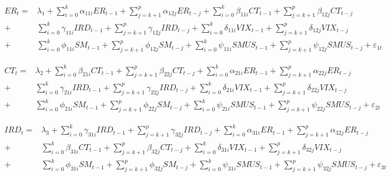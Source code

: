\documentclass[a4paper, twoside]{templates/ociamthesis}
\begin{document}
\begingroup\small

\begin{equation}
  \begin{aligned}
ER_t 
= & \lambda_1 + \sum_{i=0}^k\alpha_{11i}ER_{t-1} + \sum_{j=k+1}^p\alpha_{12j}ER_{t-j} + \sum_{i=0}^k\beta_{11i}CT_{t-1} + \sum_{j=k+1}^p\beta_{12j}CT_{t-j} \\
+ & \sum_{i=0}^k\gamma_{11i}IRD_{t-1} + \sum_{j=k+1}^p\gamma_{12j}IRD_{t-j} + \sum_{i=0}^k\delta_{11i}VIX_{t-1} + \sum_{j=k+1}^p\delta_{12j}VIX_{t-j} \\
+ & \sum_{i=0}^k\phi_{11i}SM_{t-1} + \sum_{j=k+1}^p\phi_{12j}SM_{t-j} + \sum_{i=0}^k\psi_{11i}SMUS_{t-1} + \sum_{j=k+1}^p\psi_{12j}SMUS_{t-j} +\varepsilon_{1t}
  \end{aligned}
\label{eq:b1}
\end{equation}
\endgroup

\begingroup\small

\begin{equation}
  \begin{aligned}
CT_t 
= & \lambda_2 + \sum_{i=0}^k\beta_{21i}CT_{t-1} + \sum_{j=k+1}^p\beta_{22j}CT_{t-j} + \sum_{i=0}^k\alpha_{21i}ER_{t-1} + \sum_{j=k+1}^p\alpha_{22j}ER_{t-j} \\
+ & \sum_{i=0}^k\gamma_{21i}IRD_{t-1} + \sum_{j=k+1}^p\gamma_{22j}IRD_{t-j} + \sum_{i=0}^k\delta_{21i}VIX_{t-1} + \sum_{j=k+1}^p\delta_{22j}VIX_{t-j} \\
+ & \sum_{i=0}^k\phi_{21i}SM_{t-1} + \sum_{j=k+1}^p\phi_{22j}SM_{t-j} + \sum_{i=0}^k\psi_{21i}SMUS_{t-1} + \sum_{j=k+1}^p\psi_{22j}SMUS_{t-j} +\varepsilon_{2t}
  \end{aligned}
\label{eq:b2}
\end{equation}
\endgroup

\clearpage

\begingroup\small

\begin{equation}
  \begin{aligned}
IRD_t 
= & \lambda_3 + \sum_{i=0}^k\gamma_{31i}IRD_{t-1} + \sum_{j=k+1}^p\gamma_{32j}IRD_{t-j} + \sum_{i=0}^k\alpha_{31i}ER_{t-1} + \sum_{j=k+1}^p\alpha_{32j}ER_{t-j} \\
+ & \sum_{i=0}^k\beta_{31i}CT_{t-1} + \sum_{j=k+1}^p\beta_{32j}CT_{t-j} + \sum_{i=0}^k\delta_{31i}VIX_{t-1} + \sum_{j=k+1}^p\delta_{32j}VIX_{t-j} \\
+ & \sum_{i=0}^k\phi_{31i}SM_{t-1} + \sum_{j=k+1}^p\phi_{32j}SM_{t-j} + \sum_{i=0}^k\psi_{31i}SMUS_{t-1} + \sum_{j=k+1}^p\psi_{32j}SMUS_{t-j} +\varepsilon_{3t}
  \end{aligned}
\label{eq:b3}
\end{equation}
\endgroup
\end{document}
